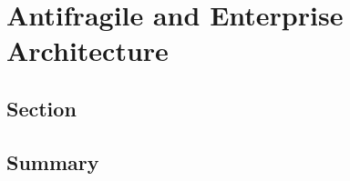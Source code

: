 \chapter{Antifragile and Enterprise Architecture}
\label{ch:afenterprisearchitecture}
\lipsum[1]
\section{Section}
\label{sec:afeasection}
\lipsum[1]
\section{Summary}
\label{sec:afeasummary}
\lipsum[1]